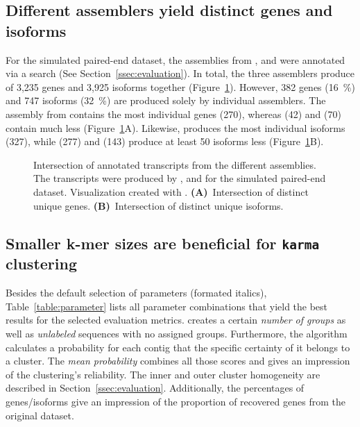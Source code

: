 \documentclass[12pt,a4paper,english]{article}
\begin{document}
	\subsection{Different assemblers yield distinct genes and isoforms}
	For the simulated paired-end dataset, the assemblies from \spades, \trinity and \soap were annotated via a \blast search (See Section~\ref{ssec:evaluation}).
	In total, the three assemblers produce of 3,235 genes and 3,925 isoforms together (Figure~\ref{img:difference}).
	However, 382 genes (16~\%) and 747 isoforms (32~\%) are produced solely by individual assemblers. The assembly from \spades contains the most individual genes (270), whereas \trinity (42) and \soap (70) contain much less (Figure~\ref{img:difference}A). Likewise, \spades produces the most individual isoforms (327), while \soap (277) and \trinity (143) produce at least 50 isoforms less (Figure~\ref{img:difference}B). 
	\begin{figure}[H]
		\def\svgwidth{\textwidth}
		
		\caption[Intersection of annotated transcripts from the different assemblies.]{Intersection of annotated transcripts from the different assemblies. The transcripts were produced by \spades, \soap and \trinity for the simulated paired-end \celegans dataset. Visualization created with \intervene \citep{intervene:17}. \textbf{(A)}~Intersection of distinct unique genes. \textbf{(B)}~Intersection of distinct unique isoforms.}
		\label{img:difference}
	\end{figure}
	
	\subsection{Smaller k-mer sizes are beneficial for \texttt{karma} clustering}
	\label{ssec:parameter}
	
	Besides the default selection of parameters (formated italics), Table~\ref{table:parameter} lists all parameter combinations that yield the best results for the selected evaluation metrics.
	\hdbscan creates a certain \textit{number of groups} as well as \textit{unlabeled} sequences with no assigned groups. Furthermore, the algorithm calculates a probability for each contig that the specific certainty of it belongs to a cluster. The \textit{mean probability} combines all those scores and gives an impression of the clustering's reliability. The inner and outer cluster homogeneity are described in Section~\ref{ssec:evaluation}. Additionally, the percentages of genes/isoforms give an impression of the proportion of recovered genes from the original dataset.
	
\end{document}
